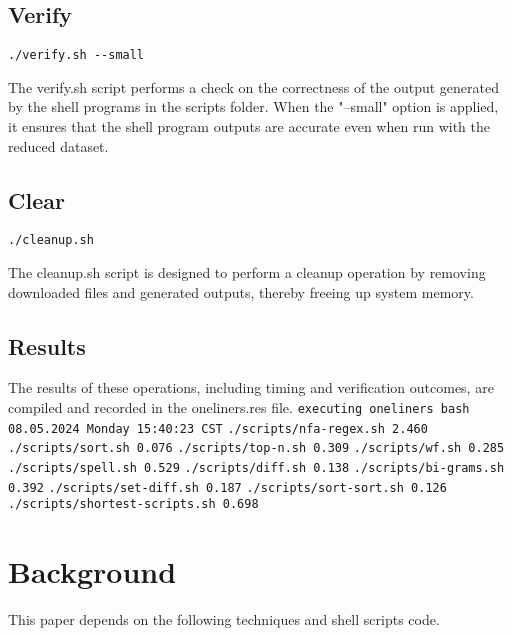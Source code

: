 \documentclass[sigplan, screen, 10pt]{acmart}
\begin{document}
\subsection{Verify}
\begin{verbatim}
./verify.sh --small
\end{verbatim}
The verify.sh script performs a check on the correctness of the output generated by the shell programs in the scripts folder. When the "--small" option is applied, it ensures that the shell program outputs are accurate even when run with the reduced dataset.
\subsection{Clear}
\begin{verbatim}
./cleanup.sh
\end{verbatim}
The cleanup.sh script is designed to perform a cleanup operation by removing downloaded files and generated outputs, thereby freeing up system memory.

\subsection{Results}
The results of these operations, including timing and verification outcomes, are compiled and recorded in the oneliners.res file.\newline
\texttt{executing oneliners bash 08.05.2024 Monday 15:40:23 CST}
\texttt{./scripts/nfa-regex.sh 2.460} \newline
\texttt{./scripts/sort.sh 0.076}\newline
\texttt{./scripts/top-n.sh 0.309}\newline
\texttt{./scripts/wf.sh 0.285}\newline
\texttt{./scripts/spell.sh 0.529}\newline
\texttt{./scripts/diff.sh 0.138}\newline
\texttt{./scripts/bi-grams.sh 0.392}\newline
\texttt{./scripts/set-diff.sh 0.187}\newline
\texttt{./scripts/sort-sort.sh 0.126}\newline
\texttt{./scripts/shortest-scripts.sh 0.698}

\section{Background}
\label{bg}
This paper depends on the following techniques and shell scripts code.
\end{document}
